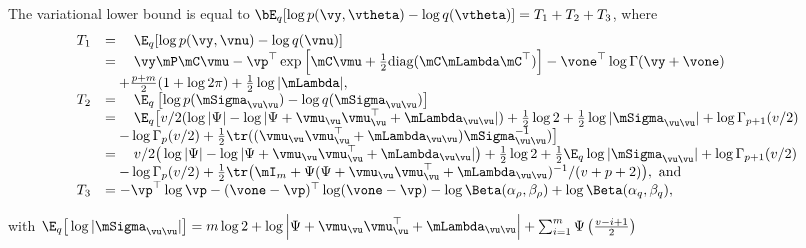 The variational lower bound is equal to $\bE_q[\log{p(\vy, \vtheta)} - \log{q(\vtheta)}] = T_1 + T_2 + T_3$,
where
$$
\begin{array}{rl}
	T_1 & = \quad \E_q[\log{p(\vy, \vnu)} - \log{q(\vnu)}]                                                                                                                                                  \\
	    & = \quad \vy \mP \mC \vmu - \vp^\top \exp{\left[ \mC \vmu + \frac{1}{2} \text{diag} (\mC \mLambda \mC^\top) \right]} - \vone^\top\log \Gamma{(\vy + \vone)}                                               \\
	    & \quad + \frac{p + m}{2} (1 + \log{2 \pi}) + \frac{1}{2} \log{|\mLambda|},                                                                                                                                \\
	T_2 & = \quad \E_q \left[ \log p(\mSigma_{\vu \vu}) - \log q(\mSigma_{\vu \vu}) \right]                                                                                                                 \\
	    & = \quad \E_q \big[ v/2(\log |\Psi| - \log |\Psi + \vmu_\vu \vmu_\vu^\top + \mLambda_{\vu \vu}|) + \frac{1}{2} \log 2 + \frac{1}{2} \log|\mSigma_{\vu \vu}| + \log \Gamma_{p+1}(v/2) \\
	    & \quad - \log \Gamma_{p}(v/2) + \frac{1}{2} \tr((\vmu_{\vu} \vmu_{\vu}^\top + \mLambda_{\vu \vu}) \mSigma_{\vu \vu}^{-1}) \big]                                                                                                  \\
	    & = \quad v/2\big(\log |\Psi| - \log |\Psi + \vmu_\vu \vmu_\vu^\top + \mLambda_{\vu \vu}|\big) + \frac{1}{2} \log 2 + \frac{1}{2} \E_q \log |\mSigma_{\vu \vu}| + \log \Gamma_{p+1}(v/2) \\
	    & \quad - \log \Gamma_{p}(v/2) + \frac{1}{2} \tr\big(\mI_m + \Psi(\Psi+ \vmu_\vu \vmu_\vu^\top + \mLambda_{\vu \vu})^{-1}/(v + p + 2)\big), \text{ and }                                                                                       \\
	T_3 & = - \vp^\top \log \vp - (\vone - \vp)^\top \log (\vone - \vp) - \log \Beta (\alpha_\rho, \beta_\rho) + \log \Beta (\alpha_q, \beta_q),
\end{array}
$$
	
\noindent with $\E_q \big[ \log |\mSigma_{\vu \vu}| \big] = m \log 2 + \log \left | \Psi + \vmu_\vu \vmu_\vu^\top + \mLambda_{\vu \vu} \right | + \sum_{i=1}^m \Psi \left ( \frac{v - i + 1}{2} \right )$


